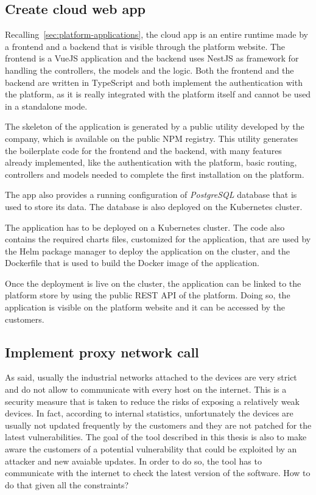 \subsection{Create cloud web app}

Recalling~\cref{sec:platform-applications}, the cloud app is an entire runtime made by a frontend and a backend that is visible through the platform website. The frontend is a VueJS application and the backend uses NestJS as framework for handling the controllers, the models and the logic. Both the frontend and the backend are written in TypeScript and both implement the authentication with the platform, as it is really integrated with the platform itself and cannot be used in a standalone mode.

The skeleton of the application is generated by a public utility developed by the company, which is available on the public NPM registry. This utility generates the boilerplate code for the frontend and the backend, with many features already implemented, like the authentication with the platform, basic routing, controllers and models needed to complete the first installation on the platform.

The app also provides a running configuration of \textit{PostgreSQL} database that is used to store its data. The database is also deployed on the Kubernetes cluster.

The application has to be deployed on a Kubernetes cluster. The code also contains the required charts files, customized for the application, that are used by the Helm package manager to deploy the application on the cluster, and the Dockerfile that is used to build the Docker image of the application.

Once the deployment is live on the cluster, the application can be linked to the platform store by using the public REST API of the platform. Doing so, the application is visible on the platform website and it can be accessed by the customers.

\subsection{Implement proxy network call}

As said, usually the industrial networks attached to the devices are very strict and do not allow to communicate with every host on the internet. This is a security measure that is taken to reduce the risks of exposing a relatively weak devices. In fact, according to internal statistics, unfortunately the devices are usually not updated frequently by the customers and they are not patched for the latest vulnerabilities. The goal of the tool described in this thesis is also to make aware the customers of a potential vulnerability that could be exploited by an attacker and new avaiable updates. In order to do so, the tool has to communicate with the internet to check the latest version of the software. How to do that given all the constraints?

